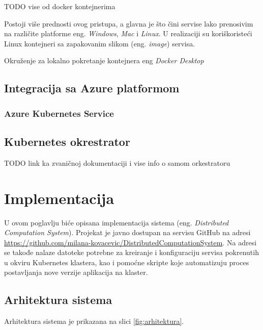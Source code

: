\documentclass[12pt,oneside]{memoir}
\begin{document}
TODO vise od docker kontejnerima

Postoji više prednosti ovog pristupa, a glavna je što čini servise lako prenosivim na različite platforme eng. \emph{Windows}, \emph{Mac} i \emph{Linux}. U realizaciji su koriškoristeći Linux kontejneri sa zapakovanim slikom (eng. \emph{image}) servisa.

Okruženje za lokalno pokretanje kontejnera eng \emph{Docker Desktop}



\section{Integracija sa Azure platformom}

\subsection{Azure Kubernetes Service}

\section{Kubernetes okrestrator}
TODO link ka zvaničnoj dokumentaciji i vise info o samom orkestratoru


\chapter{Implementacija}
\label{chp:impl}

U ovom poglavlju biće opisana implementacija sistema (eng. \emph{Distributed Computation System}).
Projekat je javno dostupan na servisu GitHub na adresi \href{https://github.com/milana-kovacevic/DistributedComputationSystem}{https://github.com/milana-kovacevic/DistributedComputationSystem}. Na adresi se takođe nalaze datoteke potrebne za kreiranje i konfiguraciju servisa pokrenutih u okviru Kubernetes klastera, kao i pomoćne skripte koje automatizuju proces postavljanja nove verzije aplikacija na klaster.


\section{Arhitektura sistema}

Arhitektura sistema je prikazana na slici \ref{fig:arhitektura}.
\end{document}
